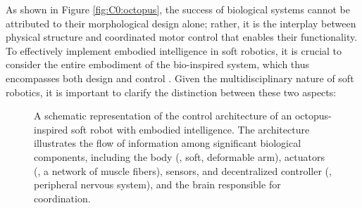 As shown in Figure \ref{fig:C0:octopus}, the success of biological systems cannot be attributed to their morphological design alone; rather, it is the interplay between physical structure and coordinated motor control that enables their functionality. To effectively implement embodied intelligence in soft robotics, it is crucial to consider the entire embodiment of the bio-inspired system, which thus encompasses both design and control \cite{Rus2015, Hawkes2017}. Given the multidisciplinary nature of soft robotics, it is important to clarify the distinction between these two aspects:


\begin{figure}
  \centering
  
  \caption{\small A schematic representation of the control architecture of an octopus-inspired soft robot with embodied intelligence. The architecture illustrates the flow of information among significant biological components, including the body (\eg, soft, deformable arm), actuators (\eg, a network of muscle fibers), sensors, and decentralized controller (\ie, peripheral nervous system), and the brain responsible for coordination. \label{fig:C0:biometic} }
  \vspace{-3mm}
\end{figure}

